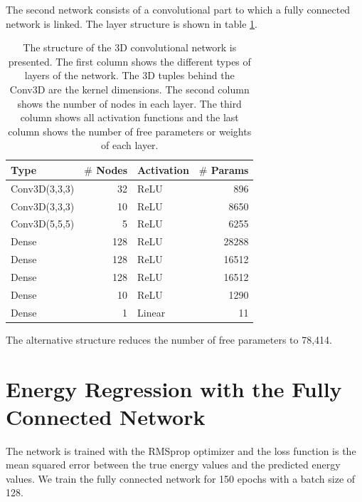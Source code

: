 \documentclass[12pt, a4paper]{thesis}
\begin{document}
The second network consists of a convolutional part to which a fully
connected network is linked. The layer structure is shown in table
\ref{conv_structure}.

\begin{table}[htbp]
  \centering
  \begin{tabular}{lrlr}
    Type & \(\#\) Nodes & Activation & \(\#\) Params\\
    \hline
    Conv3D(3,3,3) & 32 & ReLU & 896\\
    Conv3D(3,3,3) & 10 & ReLU & 8650\\
    Conv3D(5,5,5) & 5 & ReLU & 6255\\
    Dense & 128 & ReLU & 28288\\
    Dense & 128 & ReLU & 16512\\
    Dense & 128 & ReLU & 16512\\
    Dense & 10 & ReLU & 1290\\
    Dense & 1 & Linear & 11\\
  \end{tabular}

  \caption{The structure of the 3D convolutional network is
    presented. The first column shows the different types of layers of
    the network. The 3D tuples behind the Conv3D are the kernel
    dimensions. The second column shows the number of nodes in each
    layer. The third column shows all activation functions and the
    last column shows the number of free parameters or weights of each
    layer.}
  \label{conv_structure}
\end{table}

The alternative structure reduces the number of free parameters to 78,414.

\section{Energy Regression with the Fully Connected Network}
\label{sec:orgdf3234b}

The network is trained with the RMSprop optimizer and the loss
function is the mean squared error between the true energy values and
the predicted energy values. We train the fully connected network for
150 epochs with a batch size of 128.
\end{document}
